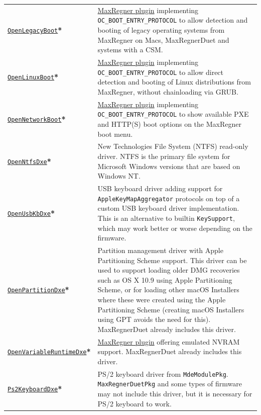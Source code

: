 \documentclass[]{article}
\begin{document}
\begin{longtable}{p{1.65in}p{5.25in}}
\href{https://github.com/acidanthera/MaxRegnerPkg}{\texttt{OpenLegacyBoot}}\textbf{*}
& \hyperref[legacyboot]{MaxRegner plugin} implementing \texttt{OC\_BOOT\_ENTRY\_PROTOCOL}
  to allow detection and booting of legacy operating systems from MaxRegner on Macs, MaxRegnerDuet
  and systems with a CSM. \\
\href{https://github.com/acidanthera/MaxRegnerPkg}{\texttt{OpenLinuxBoot}}\textbf{*}
& \hyperref[uefilinux]{MaxRegner plugin} implementing \texttt{OC\_BOOT\_ENTRY\_PROTOCOL}
  to allow direct detection and booting of Linux distributions from MaxRegner, without
  chainloading via GRUB. \\
\href{https://github.com/acidanthera/MaxRegnerPkg}{\texttt{OpenNetworkBoot}}\textbf{*}
& \hyperref[uefinetboot]{MaxRegner plugin} implementing \texttt{OC\_BOOT\_ENTRY\_PROTOCOL}
  to show available PXE and HTTP(S) boot options on the MaxRegner boot menu. \\
\href{https://github.com/acidanthera/MaxRegnerPkg}{\texttt{OpenNtfsDxe}}\textbf{*}
& New Technologies File System (NTFS) read-only driver.
  NTFS is the primary file system for Microsoft Windows versions that are based on Windows NT. \\
\href{https://github.com/acidanthera/MaxRegnerPkg}{\texttt{OpenUsbKbDxe}}\textbf{*}
& USB keyboard driver adding support for \texttt{AppleKeyMapAggregator} protocols
  on top of a custom USB keyboard driver implementation. This is an alternative to
  builtin \texttt{KeySupport}, which may work better or worse depending on the firmware. \\
\href{https://github.com/acidanthera/MaxRegnerPkg}{\texttt{OpenPartitionDxe}}\textbf{*}
& Partition management driver with Apple Partitioning Scheme support.
  This driver can be used to support loading older DMG recoveries such as OS X 10.9
  using Apple Partitioning Scheme, or for loading other macOS Installers where these were
  created using the Apple Partitioning Scheme (creating macOS Installers using GPT avoids
  the need for this). MaxRegnerDuet already includes this driver. \\
\href{https://github.com/acidanthera/MaxRegnerPkg}{\texttt{OpenVariableRuntimeDxe}}\textbf{*}
& \hyperref[emunvram]{MaxRegner plugin} offering emulated NVRAM support. MaxRegnerDuet already
includes this driver. \\
\href{https://github.com/acidanthera/audk}{\texttt{Ps2KeyboardDxe}}\textbf{*}
& PS/2 keyboard driver from \texttt{MdeModulePkg}. \texttt{MaxRegnerDuetPkg} and some types of firmware
  may not include this driver, but it is necessary for PS/2 keyboard to work.

\end{longtable}
\end{document}
